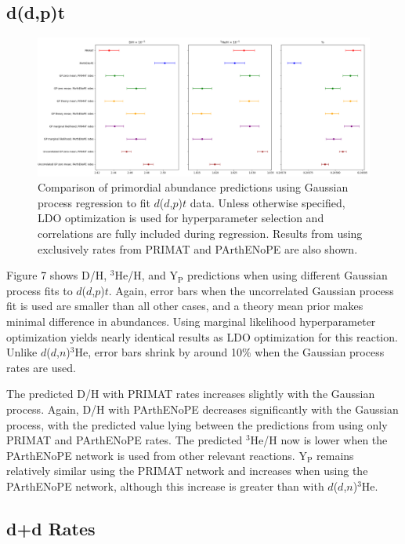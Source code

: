 \documentclass[%
 reprint,
superscriptaddress,
nofootinbib,
 amsmath,amssymb,
 aps,
 pra,
]{revtex4-2}
\begin{document}
\subsection{d(d,p)t}

\begin{figure}
	\centering
	\includegraphics[width=0.98\linewidth]{Figures/ddtp_comp.png}
	\caption{Comparison of primordial abundance predictions using Gaussian process regression to fit $d$($d$,$p$)$t$ data. Unless otherwise specified, LDO optimization is used for hyperparameter selection and correlations are fully included during regression. Results from using exclusively rates from PRIMAT and PArthENoPE are also shown.}
\end{figure}

Figure 7 shows D/H, $^3$He/H, and Y$_\text{P}$ predictions when using different Gaussian process fits to $d$($d$,$p$)$t$. Again, error bars when the uncorrelated Gaussian process fit is used are smaller than all other cases, and a theory mean prior makes minimal difference in abundances. Using marginal likelihood hyperparameter optimization yields nearly identical results as LDO optimization for this reaction. Unlike $d$($d$,$n$)$^3$He, error bars shrink by around 10\% when the Gaussian process rates are used.

The predicted D/H with PRIMAT rates increases slightly with the Gaussian process. Again, D/H with PArthENoPE decreases significantly with the Gaussian process, with the predicted value lying between the predictions from using only PRIMAT and PArthENoPE rates. The predicted $^3$He/H now is lower when the PArthENoPE network is used from other relevant reactions. Y$_\text{P}$ remains relatively similar using the PRIMAT network and increases when using the PArthENoPE network, although this increase is greater than with $d$($d$,$n$)$^3$He. 

\subsection{d+d Rates}
\end{document}
